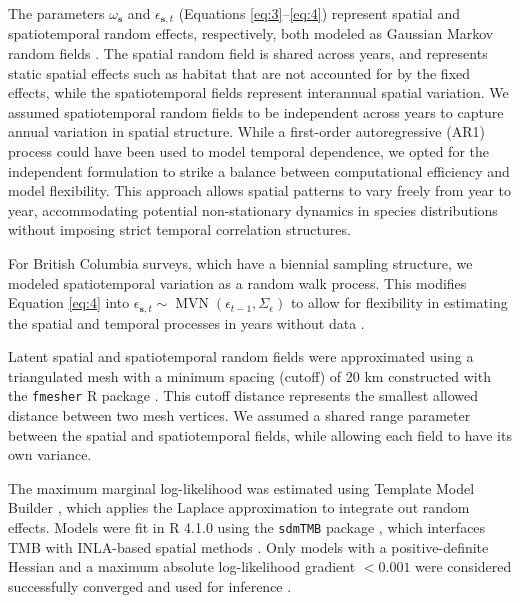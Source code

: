 \documentclass[11pt]{article}
\begin{document}
\begin{spacing}{1.5}
The parameters \( \omega_{\mathbf{s}} \) and \( \epsilon_{\mathbf{s},t} \) (Equations \ref{eq:3}--\ref{eq:4}) represent spatial and spatiotemporal random effects, respectively, both modeled as Gaussian Markov random fields \citep{lindgren_explicit_2011}. The spatial random field is shared across years, and represents static spatial effects such as habitat that are not accounted for by the fixed effects, while the spatiotemporal fields represent interannual spatial variation. We assumed spatiotemporal random fields to be independent across years to capture annual variation in spatial structure. While a first-order autoregressive (AR1) process could have been used to model temporal dependence, we opted for the independent formulation to strike a balance between computational efficiency and model flexibility. This approach allows spatial patterns to vary freely from year to year, accommodating potential non-stationary dynamics in species distributions without imposing strict temporal correlation structures.

For British Columbia surveys, which have a biennial sampling structure, we modeled spatiotemporal variation as a random walk process. This modifies Equation \ref{eq:4} into $\epsilon_{\boldsymbol{s},t} \sim  \operatorname{MVN}(\epsilon_{t-1},\Sigma_{\epsilon})$ to allow for flexibility in estimating the spatial and temporal processes in years without data \citep{ward_win_2024}.

Latent spatial and spatiotemporal random fields were approximated using a triangulated mesh with a minimum spacing (cutoff) of 20 km constructed with the \texttt{fmesher} R package \citep{lindgren_fmesher_2025}. This cutoff distance represents the smallest allowed distance between two mesh vertices. We assumed a shared range parameter between the spatial and spatiotemporal fields, while allowing each field to have its own variance.

The maximum marginal log-likelihood was estimated using Template Model Builder \citep[TMB;][]{kristensen_tmb_2016}, which applies the Laplace approximation to integrate out random effects. Models were fit in R 4.1.0 \citep{r_core_team_r_2021} using the \texttt{sdmTMB} package \citep{anderson_sdmtmb_2024}, which interfaces TMB with INLA-based spatial methods \citep{rue_approximate_2009}. Only models with a positive-definite Hessian and a maximum absolute log-likelihood gradient $< 0.001$ were considered successfully converged and used for inference \citep{anderson_sdmtmb_2024}.




\end{spacing}
\end{document}
